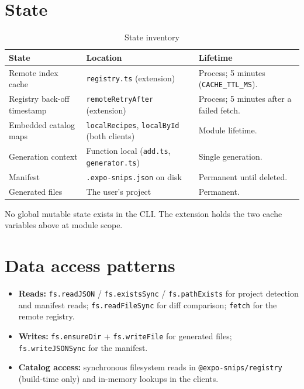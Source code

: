 \section{State}

\begin{longtable}{p{3.4cm}p{4.4cm}p{6.2cm}}
\caption{State inventory}\\
\toprule
\textbf{State} & \textbf{Location} & \textbf{Lifetime} \\
\midrule

Remote index cache & \texttt{registry.ts} (extension) & Process; 5 minutes
(\texttt{CACHE\_TTL\_MS}). \\
Registry back-off timestamp & \texttt{remoteRetryAfter} (extension) & Process; 5
minutes after a failed fetch. \\
Embedded catalog maps & \texttt{localRecipes}, \texttt{localById} (both clients) &
Module lifetime. \\
Generation context & Function local (\texttt{add.ts}, \texttt{generator.ts}) & Single
generation. \\
Manifest & \texttt{.expo-snips.json} on disk & Permanent until deleted. \\
Generated files & The user's project & Permanent. \\
\bottomrule
\end{longtable}

No global mutable state exists in the CLI. The extension holds the two cache
variables above at module scope.

\section{Data access patterns}

\begin{itemize}
  \item \textbf{Reads:} \texttt{fs.readJSON} / \texttt{fs.existsSync} /
        \texttt{fs.pathExists} for project detection and manifest reads;
        \texttt{fs.readFileSync} for diff comparison; \texttt{fetch} for the remote
        registry.
  \item \textbf{Writes:} \texttt{fs.ensureDir} + \texttt{fs.writeFile} for generated
        files; \texttt{fs.writeJSONSync} for the manifest.
  \item \textbf{Catalog access:} synchronous filesystem reads in
        \texttt{@expo-snips/registry} (build-time only) and in-memory lookups in the
        clients.
\end{itemize}

